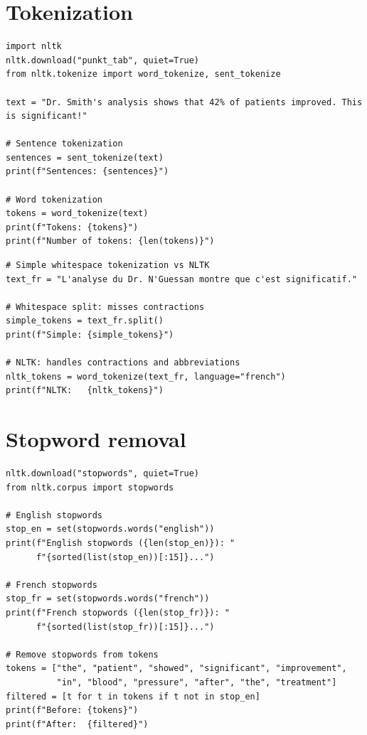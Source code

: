 \section{Tokenization}

\begin{verbatim}
import nltk
nltk.download("punkt_tab", quiet=True)
from nltk.tokenize import word_tokenize, sent_tokenize

text = "Dr. Smith's analysis shows that 42% of patients improved. This is significant!"

# Sentence tokenization
sentences = sent_tokenize(text)
print(f"Sentences: {sentences}")

# Word tokenization
tokens = word_tokenize(text)
print(f"Tokens: {tokens}")
print(f"Number of tokens: {len(tokens)}")
\end{verbatim}

\begin{verbatim}
# Simple whitespace tokenization vs NLTK
text_fr = "L'analyse du Dr. N'Guessan montre que c'est significatif."

# Whitespace split: misses contractions
simple_tokens = text_fr.split()
print(f"Simple: {simple_tokens}")

# NLTK: handles contractions and abbreviations
nltk_tokens = word_tokenize(text_fr, language="french")
print(f"NLTK:   {nltk_tokens}")
\end{verbatim}

\section{Stopword removal}

\begin{verbatim}
nltk.download("stopwords", quiet=True)
from nltk.corpus import stopwords

# English stopwords
stop_en = set(stopwords.words("english"))
print(f"English stopwords ({len(stop_en)}): "
      f"{sorted(list(stop_en))[:15]}...")

# French stopwords
stop_fr = set(stopwords.words("french"))
print(f"French stopwords ({len(stop_fr)}): "
      f"{sorted(list(stop_fr))[:15]}...")

# Remove stopwords from tokens
tokens = ["the", "patient", "showed", "significant", "improvement",
          "in", "blood", "pressure", "after", "the", "treatment"]
filtered = [t for t in tokens if t not in stop_en]
print(f"Before: {tokens}")
print(f"After:  {filtered}")
\end{verbatim}

